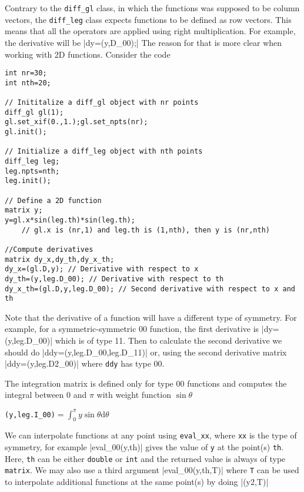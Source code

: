 Contrary to the \texttt{diff\_gl} class, in which the functions was supposed to be column vectors,
the \texttt{diff\_leg} class expects functions to be defined as row vectors. This means that
all the operators are applied using right multiplication. For example, the derivative will be
|dy=(y,D_00);|
The reason for that is more clear when working with 2D functions. Consider the code
\begin{verbatim}
int nr=30;
int nth=20;

// Inititalize a diff_gl object with nr points
diff_gl gl(1);
gl.set_xif(0.,1.);gl.set_npts(nr);
gl.init();

// Initialize a diff_leg object with nth points
diff_leg leg;
leg.npts=nth;
leg.init();

// Define a 2D function 
matrix y;
y=gl.x*sin(leg.th)*sin(leg.th);
	// gl.x is (nr,1) and leg.th is (1,nth), then y is (nr,nth)

//Compute derivatives
matrix dy_x,dy_th,dy_x_th;
dy_x=(gl.D,y); // Derivative with respect to x
dy_th=(y,leg.D_00); // Derivative with respect to th
dy_x_th=(gl.D,y,leg.D_00); // Second derivative with respect to x and th

\end{verbatim}

Note that the derivative of a function will have a different type of symmetry. 
For example, for a symmetric-symmetric 00 function, the first derivative is
|dy=(y,leg.D_00)|
which is of type 11. Then to calculate the second derivative we should do
|ddy=(y,leg.D_00,leg.D_11)|
or, using the second derivative matrix
|ddy=(y,leg.D2_00)|
where \texttt{ddy} has type 00.

The integration matrix is defined only for type 00 functions and computes the integral between 0 and $\pi$
with weight function $\sin\theta$

\verb|(y,leg.I_00)|$\displaystyle=\int_0^{\pi}y\sin\theta\mathrm{d}\theta$

We can interpolate functions at any point using \texttt{eval\_xx}, where \texttt{xx} is the type
of symmetry, for example
|eval_00(y,th)|
gives the value of \texttt{y} at the point(s) \texttt{th}. Here, \texttt{th} can be either 
\texttt{double} or \texttt{int} and the returned value is always of type \texttt{matrix}.
We may also use a third argument
|eval_00(y,th,T)|
where \texttt{T} can be used to interpolate additional functions at the same point(s) by doing
|(y2,T)|

